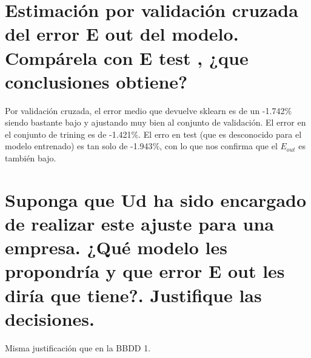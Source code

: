 \documentclass[12pt]{article}
\begin{document}
\section{Estimación por validación cruzada del error E out del modelo. Compárela con E test , ¿que
conclusiones obtiene?}

Por validación cruzada, el error medio que devuelve sklearn es de un -1.742$\%$ siendo bastante bajo y ajustando muy bien al conjunto de validación. El error en el conjunto de trining es de -1.421$\%$. El erro en test (que es desconocido para el modelo entrenado) es tan solo de -1.943$\%$, con lo que nos confirma que el $E_{out}$ es también bajo.

\section{Suponga que Ud ha sido encargado de realizar este ajuste para una empresa. ¿Qué modelo
les propondría y que error E out les diría que tiene?. Justifique las decisiones.}

Misma justificación que en la BBDD 1.







 
\end{document}
